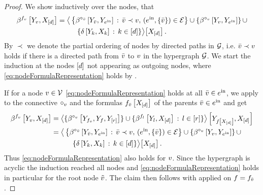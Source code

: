 \begin{proof}
    We show inductively over the nodes, that
    \begin{align}
        \label{eq:nodeFormulaRepresentation}
        \beta^{f_{v}}\left[Y_{v},X_{[d]}\right]
        = \big\langle 
            &\left\{
            \beta^{\circ_{\bar{v}}}\left[Y_{\bar{v}},Y_{e^{\mathrm{in}}}\right] \,:\, \bar{v}\prec v ,\, (e^{\mathrm{in}},\{\bar{v}\})\in\mathcal{E}
            \right\} \cup \left\{\beta^{\circ_{v}}\left[Y_{v},Y_{e^{\mathrm{in}}}\right]\right\}  \cup \\
            & \quad \{\delta\left[Y_{k},X_{k}\right] \,:\, k\in[d]\}
         \big\rangle \big[ X_{[d]} \big] \, .
    \end{align}
    By $\prec$ we denote the partial ordering of nodes by directed paths in $\mathcal{G}$, i.e. $\bar{v} \prec v$ holds if there is a directed path from $\bar{v}$ to $v$ in the hypergraph $\mathcal{G}$.
    We start the induction at the nodes $[d]$ not appearing as outgoing nodes, where \eqref{eq:nodeFormulaRepresentation} holds by .

    If for a node $v\in\mathcal{V}$ \eqref{eq:nodeFormulaRepresentation} holds at all $\bar{v}\in e^{\mathrm{in}}$, we apply  to the connective $\circ_{v}$ and the formulas $f_{\bar{v}}\left[X_{[d]}\right]$ of the parents $\bar{v}\in e^{\mathrm{in}}$ and get
    \begin{align*}
        \beta^{f_{v}}\left[Y_{v},X_{[d]}\right]
        &= \left\langle 
            \{\beta^{\circ_{v}}\left[Y_{f_{v}},Y_{f},Y_{[r]}\right]\}
            \cup \{\beta^{f_{l}}\left[Y_{l},X_{[d]}\right] \,:\, l\in[r] \}
        \right\rangle \left[ Y_{f\left[X_{[d]}\right]},X_{[d]} \right] \\
        & = \big\langle 
            \left\{
            \beta^{\circ_{\bar{v}}}\left[Y_{\bar{v}},Y_{e^{\mathrm{in}}}\right] \,:\, \bar{v}\prec v ,\, (e^{\mathrm{in}},\{\bar{v}\})\in\mathcal{E}
            \right\} \cup \left\{\beta^{\circ_{v}}\left[Y_{v},Y_{e^{\mathrm{in}}}\right]\right\} \cup \\
            & \quad\quad\quad \{\delta\left[Y_{k},X_{k}\right] \,:\, k\in[d]\}
         \big\rangle \big[ X_{[d]} \big] \, .
    \end{align*}
    Thus \eqref{eq:nodeFormulaRepresentation} also holds for $v$.
    Since the hypergraph is acyclic the induction reached all nodes and \eqref{eq:nodeFormulaRepresentation} holds in particular for the root node $\tilde{v}$.
    The claim then follows with  applied on $f=f_{\tilde{v}}$.
\end{proof}

